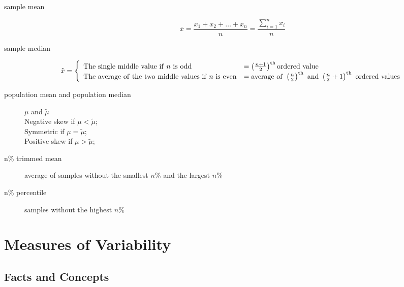 \begin{description}
	\item[sample mean]
	$$\bar{x} = \frac{x_1 + x_2 + \dots + x_n}{n} = \frac{\sum\limits_{i= 1}^{n} x_i}{n}$$
	\item[sample median]
	$$\tilde{x} = 
	\left\{\begin{array}{ll}
	{\rm The\ single\ middle\ value\ if\ }n{\rm\ is\ odd} &
	= \left( \frac{n + 1}{2} \right) ^ {\rm th} {\rm ordered\ value}\\
	{\rm The\ average\ of\ the\ two\ middle\ values\ if\ }n{\rm \ is\ even} &
	= {\rm average\ of\ } \left( \frac{n}{2} \right) ^ {\rm th} {\rm \ and\ }\left( \frac{n}{2} + 1 \right) ^ {\rm th} {\rm \ ordered\ values} \\
	\end{array}\right.$$
	\item[population mean and population median] $\mu$ and $\tilde{\mu}$\\
	Negative skew if $\mu < \tilde{\mu}$;\\
	Symmetric if $\mu = \tilde{\mu}$;\\
	Positive skew if $\mu > \tilde{\mu}$;
	\item[n\% trimmed mean] average of samples without the smallest $n$\% and the largest $n$\%
	\item[n\% percentile] samples without the highest $n$\%
\end{description}

\section{Measures of Variability}

\subsection{Facts and Concepts}

